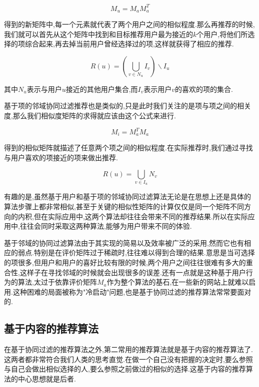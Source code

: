 \begin{equation}
	M_u = M_a M_a^T
\end{equation}

得到的新矩阵中,每一个元素就代表了两个用户之间的相似程度.那么再推荐的时候,我们就可以首先从这个矩阵中找到和目标推荐用户最为接近的$k$个用户,将他们所选择的项综合起来,再去掉当前用户曾经选择过的项,这样就获得了相应的推荐.

\begin{equation}
	R(u) = \left(\bigcup_{v \in N_u} I_v\right) \backslash I_u
\end{equation}

其中$N_u$表示与用户$u$接近的其他用户集合,而$I_v$表示用户$v$的喜欢的项的集合.

基于项的邻域协同过滤推荐也是类似的,只是此时我们关注的是项与项之间的相关度,那么我们相似度矩阵的求得就应该由这个公式来进行.

\begin{equation}
	M_i = M_a^T M_a
\end{equation}

得到的相似矩阵就描述了任意两个项之间的相似程度.在实际推荐时,我们通过寻找与用户喜欢的项接近的项来做出推荐.

\begin{equation}
		R(u) = \bigcup_{v \in I_u} N_v
\end{equation}

有趣的是,虽然基于用户和基于项的邻域协同过滤算法无论是在思想上还是具体的算法步骤上都非常相似,甚至于关键的相似性矩阵的计算仅仅是同一个矩阵不同方向的内积,但在实际应用中,这两个算法却往往会带来不同的推荐结果.所以在实际应用中,往往会同时采取这两种算法,能够为用户带来不同的体验.

基于邻域的协同过滤算法由于其实现的简易以及效率被广泛的采用,然而它也有相应的弱点.特别是在评价矩阵过于稀疏时,往往难以得到合理的结果.意思是当可选择的项很多,但用户和用户的喜好比较有限的时候,两个用户之间往往很难有多大的重合性,这样子在寻找邻域的时候就会出现很多的误差.还有一点就是这种基于用户行为的算法,太过于依靠评价矩阵$M_a$作为整个算法的基石,在一些新的网站上就难以启用.这种困难的局面被称为"冷启动"问题,也是基于协同过滤的推荐算法常常要面对的.


\subsection{基于内容的推荐算法}\label{sec:content-based}

在基于协同过滤的推荐算法之外,第二常用的推荐算法就是基于内容的推荐算法了.这两者都非常符合我们人类的思考直觉.在做一个自己没有把握的决定时,要么参照与自己会做出相似选择的人,要么参照之前做过的相似的选择.这基于内容的推荐算法的中心思想就是后者.

